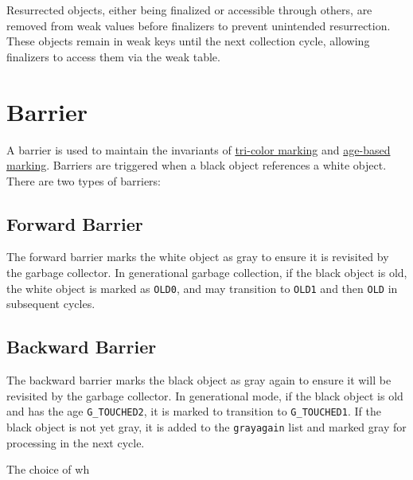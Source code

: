 \documentclass[10pt]{article}
\renewcommand{\normalsize}{\small}
\begin{document}
\begin{appendices}
Resurrected objects, either being finalized or accessible through others, are removed from weak values before finalizers to prevent unintended resurrection. These objects remain in weak keys until the next collection cycle, allowing finalizers to access them via the weak table.

\section{Barrier} \label{sec:barrier}

A barrier is used to maintain the invariants of \hyperref[sec:tri_color_marking]{tri-color marking} and \hyperref[sec:age_based_marking]{age-based marking}. Barriers are triggered when a black object references a white object. There are two types of barriers:

\subsection{Forward Barrier} \label{sec:forward_barrier}

The forward barrier marks the white object as gray to ensure it is revisited by the garbage collector. In generational garbage collection, if the black object is old, the white object is marked as \texttt{OLD0}, and may transition to \texttt{OLD1} and then \texttt{OLD} in subsequent cycles.

\subsection{Backward Barrier} \label{sec:backward_barrier}

The backward barrier marks the black object as gray again to ensure it will be revisited by the garbage collector. In generational mode, if the black object is old and has the age \texttt{G\_TOUCHED2}, it is marked to transition to \texttt{G\_TOUCHED1}. If the black object is not yet gray, it is added to the \texttt{grayagain} list and marked gray for processing in the next cycle.

The choice of wh
  

  \vspace{-1ex} %

\end{appendices}

\let\tiny=\scriptsize
\let\scriptsize=\footnotesize
\let\footnotesize=\small
\let\small=\normalsize
\let\normalsize=\large
\let\large=\Large
\let\Large=\LARGE
\let\LARGE=\huge
\let\huge=\Huge
\end{document}
